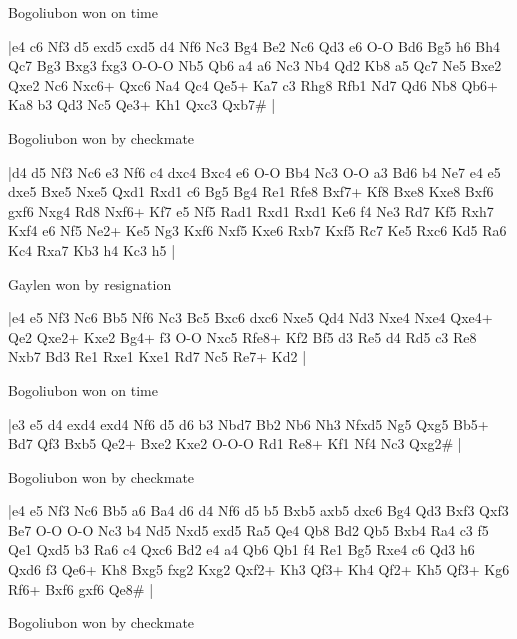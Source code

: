 \showboard

Bogoliubon won on time

\makegametitle
|e4 c6 Nf3 d5 exd5 cxd5 d4 Nf6 Nc3 Bg4 Be2 Nc6 Qd3 e6 O-O Bd6 Bg5 h6 Bh4 Qc7 Bg3 Bxg3 fxg3 O-O-O Nb5 Qb6 a4 a6 Nc3 Nb4 Qd2 Kb8 a5 Qc7 Ne5 Bxe2 Qxe2 Nc6 Nxc6+ Qxc6 Na4 Qc4 Qe5+ Ka7 c3 Rhg8 Rfb1 Nd7 Qd6 Nb8 Qb6+ Ka8 b3 Qd3 Nc5 Qe3+ Kh1 Qxc3 Qxb7\#  |

\showboard

Bogoliubon won by checkmate

\makegametitle
|d4 d5 Nf3 Nc6 e3 Nf6 c4 dxc4 Bxc4 e6 O-O Bb4 Nc3 O-O a3 Bd6 b4 Ne7 e4 e5 dxe5 Bxe5 Nxe5 Qxd1 Rxd1 c6 Bg5 Bg4 Re1 Rfe8 Bxf7+ Kf8 Bxe8 Kxe8 Bxf6 gxf6 Nxg4 Rd8 Nxf6+ Kf7 e5 Nf5 Rad1 Rxd1 Rxd1 Ke6 f4 Ne3 Rd7 Kf5 Rxh7 Kxf4 e6 Nf5 Ne2+ Ke5 Ng3 Kxf6 Nxf5 Kxe6 Rxb7 Kxf5 Rc7 Ke5 Rxc6 Kd5 Ra6 Kc4 Rxa7 Kb3 h4 Kc3 h5  |

\showboard

Gaylen won by resignation

\makegametitle
|e4 e5 Nf3 Nc6 Bb5 Nf6 Nc3 Bc5 Bxc6 dxc6 Nxe5 Qd4 Nd3 Nxe4 Nxe4 Qxe4+ Qe2 Qxe2+ Kxe2 Bg4+ f3 O-O Nxc5 Rfe8+ Kf2 Bf5 d3 Re5 d4 Rd5 c3 Re8 Nxb7 Bd3 Re1 Rxe1 Kxe1 Rd7 Nc5 Re7+ Kd2  |

\showboard

Bogoliubon won on time

\makegametitle
|e3 e5 d4 exd4 exd4 Nf6 d5 d6 b3 Nbd7 Bb2 Nb6 Nh3 Nfxd5 Ng5 Qxg5 Bb5+ Bd7 Qf3 Bxb5 Qe2+ Bxe2 Kxe2 O-O-O Rd1 Re8+ Kf1 Nf4 Nc3 Qxg2\#  |

\showboard

Bogoliubon won by checkmate

\makegametitle
|e4 e5 Nf3 Nc6 Bb5 a6 Ba4 d6 d4 Nf6 d5 b5 Bxb5 axb5 dxc6 Bg4 Qd3 Bxf3 Qxf3 Be7 O-O O-O Nc3 b4 Nd5 Nxd5 exd5 Ra5 Qe4 Qb8 Bd2 Qb5 Bxb4 Ra4 c3 f5 Qe1 Qxd5 b3 Ra6 c4 Qxc6 Bd2 e4 a4 Qb6 Qb1 f4 Re1 Bg5 Rxe4 c6 Qd3 h6 Qxd6 f3 Qe6+ Kh8 Bxg5 fxg2 Kxg2 Qxf2+ Kh3 Qf3+ Kh4 Qf2+ Kh5 Qf3+ Kg6 Rf6+ Bxf6 gxf6 Qe8\#  |

\showboard

Bogoliubon won by checkmate


